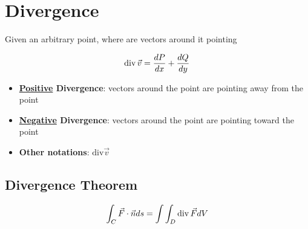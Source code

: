 \section{Divergence}

  Given an arbitrary point, where are vectors around it pointing

  \begin{equation}
    \operatorname{div} \vec{v} = \frac{dP}{dx} + \frac{dQ}{dy}
  \end{equation}

  \begin{itemize}
    \item \textbf{\ul{Positive} Divergence}: vectors around the point are
    pointing away from the point
    \item \textbf{\ul{Negative} Divergence}: vectors around the point are
    pointing toward the point
    \item \textbf{Other notations}: $ \text{div} \vec{v} $
  \end{itemize}

  \subsection{Divergence Theorem}

    \begin{equation}
      \int_{C} \vec{F} \cdot \vec{n} ds = \int \int_{D} \operatorname{div} \vec{F} dV
    \end{equation}